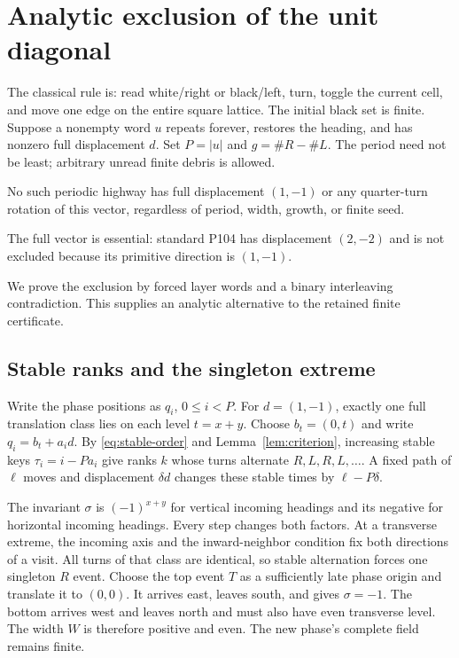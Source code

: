 \section{Analytic exclusion of the unit diagonal}\label{app:unit}
The classical rule is: read white/right or black/left, turn, toggle the current
cell, and move one edge on the entire square lattice. The initial black set is
finite. Suppose a nonempty word $u$ repeats forever, restores the heading, and
has nonzero full displacement $d$. Set $P=|u|$ and $g=\#R-\#L$. The period
need not be least; arbitrary unread finite debris is allowed.

\begin{theorem}\label{ud:thm:unit}
No such periodic highway has full displacement $(1,-1)$ or any quarter-turn
rotation of this vector, regardless of period, width, growth, or finite seed.
\end{theorem}
The full vector is essential: standard P104 has displacement $(2,-2)$ and is
not excluded because its primitive direction is $(1,-1)$.

We prove the exclusion by forced layer words and a binary interleaving
contradiction. This supplies an analytic alternative to the retained finite
certificate.

\subsection{Stable ranks and the singleton extreme}
Write the phase positions as $q_i$, $0\le i<P$. For $d=(1,-1)$, exactly one
full translation class lies on each level $t=x+y$. Choose $b_t=(0,t)$ and write
$q_i=b_t+a_i d$. By \eqref{eq:stable-order} and Lemma~\ref{lem:criterion},
increasing stable keys $\tau_i=i-Pa_i$ give ranks $k$ whose turns alternate
$R,L,R,L,\ldots$.
A fixed path of $\ell$ moves and displacement $\delta d$ changes
these stable times by $\ell-P\delta$.

The invariant $\sigma$ is $(-1)^{x+y}$ for vertical incoming headings and its
negative for horizontal incoming headings. Every step changes both factors.
At a transverse extreme, the incoming axis and the inward-neighbor condition
fix both directions of a visit. All turns of that class are identical, so
stable alternation forces one singleton $R$ event. Choose the top event $T$
as a sufficiently late phase origin and translate it to $(0,0)$. It arrives
east, leaves south, and gives $\sigma=-1$. The bottom arrives west and leaves
north and must also have even transverse level. The width $W$ is therefore
positive and even. The new phase's complete field remains finite.

